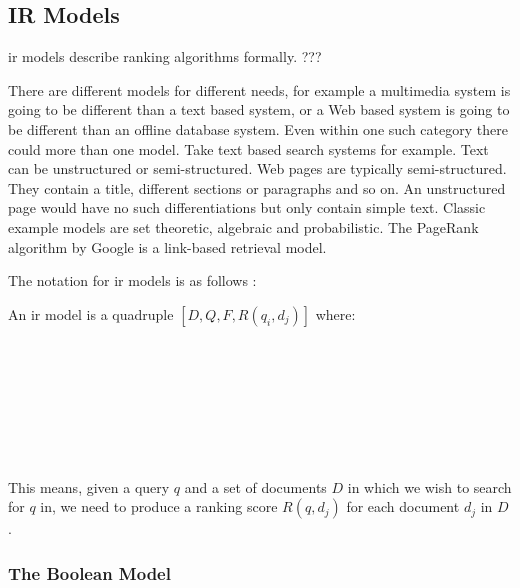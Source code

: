 \subsection{IR Models}

\begin{fcom}
  \gls{ir} models describe ranking algorithms formally. ???
\end{fcom}

There are different models for different needs, for example a multimedia system is going to be different than a text based system, or a Web based system is going to be different than an offline database system. Even within one such category there could more than one model. Take text based search systems for example. Text can be unstructured or semi-structured. Web pages are typically semi-structured. They contain a title, different sections or paragraphs and so on. An unstructured page would have no such differentiations but only contain simple text.  Classic example models are set theoretic, algebraic and probabilistic. The PageRank algorithm by Google is a link-based retrieval model.

The notation for \gls{ir} models is as follows \autocite[adapted from][p.58]{Baeza-Yates2011}:

An \gls{ir} model is a quadruple $[D,Q,F,R(q_i, d_j)]$ where:\\
 \\
 \\
 \\
\itab{}    \\
            \\
 \\
            \\
\itab{}     

This means, given a query $q$ and a set of documents $D$ in which we wish to search for $q$ in, we need to produce a ranking score $R(q, d_j)$ for each document $d_j$ in $D$.



\subsubsection{The Boolean Model}


